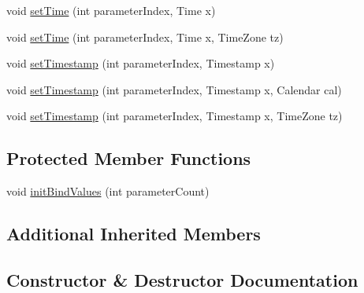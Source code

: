 \begin{DoxyCompactItemize}
void \mbox{\hyperlink{classcom_1_1mysql_1_1cj_1_1_server_prepared_query_bindings_aa746ec4d5279c4987fc95f8d8c14c950}{set\+Time}} (int parameter\+Index, Time x)
\item 
void \mbox{\hyperlink{classcom_1_1mysql_1_1cj_1_1_server_prepared_query_bindings_a0ad6b210931aaf77c8038142968b3f54}{set\+Time}} (int parameter\+Index, Time x, Time\+Zone tz)
\item 
void \mbox{\hyperlink{classcom_1_1mysql_1_1cj_1_1_server_prepared_query_bindings_a163546356d456fa9ebeea955ec61ad35}{set\+Timestamp}} (int parameter\+Index, Timestamp x)
\item 
void \mbox{\hyperlink{classcom_1_1mysql_1_1cj_1_1_server_prepared_query_bindings_a8483a3d5f6743cb4e6b678c407e2a7a0}{set\+Timestamp}} (int parameter\+Index, Timestamp x, Calendar cal)
\item 
void \mbox{\hyperlink{classcom_1_1mysql_1_1cj_1_1_server_prepared_query_bindings_a01f10892a7da4f61c5b91958ac6d57b2}{set\+Timestamp}} (int parameter\+Index, Timestamp x, Time\+Zone tz)
\end{DoxyCompactItemize}
\subsection*{Protected Member Functions}
\begin{DoxyCompactItemize}
\item 
void \mbox{\hyperlink{classcom_1_1mysql_1_1cj_1_1_server_prepared_query_bindings_ae502eedc58e9ab3740bcae8c62e09cc6}{init\+Bind\+Values}} (int parameter\+Count)
\end{DoxyCompactItemize}
\subsection*{Additional Inherited Members}


\subsection{Constructor \& Destructor Documentation}
\mbox{\label{classcom_1_1mysql_1_1cj_1_1_server_prepared_query_bindings_ab65a68783b4405e29b56c86ba0f58d30}} 
